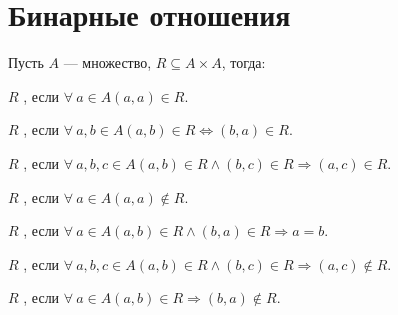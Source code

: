 \section{Бинарные отношения}\label{sec:ch-2-sec-2}

\begin{definition}
    Пусть $A$ --- множество, $R \subseteq A \times A$, тогда:

    \begin{compactitem}
        \item $R$ , если $\forall ~a \in A (a, a) \in R$.
        \item $R$ , если $\forall ~a, b \in A (a, b) \in R \Leftrightarrow (b, a) \in R$.
        \item $R$ , если $\forall ~a, b, c \in A (a, b) \in R \wedge (b, c) \in R \Rightarrow (a, c) \in R$.
        \item $R$ , если $\forall ~a \in A (a, a) \notin R$.
        \item $R$ , если $\forall ~a \in A (a, b) \in R \wedge (b, a) \in R \Rightarrow a = b$.
        \item $R$ , если $\forall ~a, b, c \in A (a, b) \in R \wedge (b, c) \in R \Rightarrow (a, c) \notin R$.
        \item $R$ , если $\forall ~a \in A (a, b) \in R \Rightarrow (b, a) \notin R$.
    \end{compactitem}
\end{definition}